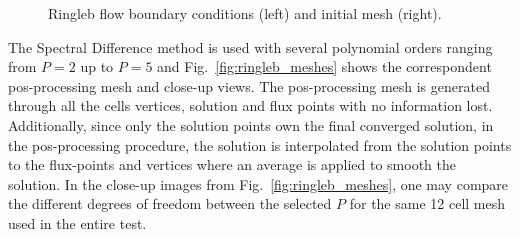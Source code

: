 %
\begin{figure}[H]
	\centering
    \caption{Ringleb flow boundary conditions (left) and initial mesh (right).}
    \label{fig:ringleb_boundary_condition}
\end{figure}
%
The Spectral Difference method is used with several polynomial orders ranging from $P=2$ up to $P=5$ and Fig.\ \ref{fig:ringleb_meshes} shows the correspondent pos-processing mesh and close-up views. The pos-processing mesh is generated through all the cells vertices, solution and flux points with no information lost. Additionally, since only the solution points own the final converged solution, in the pos-processing procedure, the solution is interpolated from the solution points to the flux-points and vertices where an average is applied to smooth the solution. In the close-up images from Fig.\ \ref{fig:ringleb_meshes}, one may compare the different degrees of freedom between the selected $P$ for the same 12 cell mesh used in the entire test.

